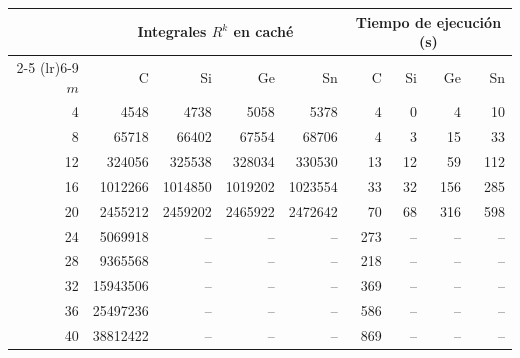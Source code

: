 \begin{tabular}{rrrrrrrrr}
    \toprule
     & \multicolumn{4}{c}{Integrales $R^k$ en caché} & \multicolumn{4}{c}{Tiempo de ejecución (s)} \\
    \cmidrule(lr){2-5} \cmidrule(lr){6-9}
    $m$ & C & Si & Ge & Sn & C & Si & Ge & Sn \\
    \midrule
    4 & 4548 & 4738 & 5058 & 5378 & 4 & 0 & 4 & 10 \\
    8 & 65718 & 66402 & 67554 & 68706 & 4 & 3 & 15 & 33 \\
    12 & 324056 & 325538 & 328034 & 330530 & 13 & 12 & 59 & 112 \\
    16 & 1012266 & 1014850 & 1019202 & 1023554 & 33 & 32 & 156 & 285 \\
    20 & 2455212 & 2459202 & 2465922 & 2472642 & 70 & 68 & 316 & 598 \\
    24 & 5069918 & -- & -- & -- & 273 & -- & -- & -- \\
    28 & 9365568 & -- & -- & -- & 218 & -- & -- & -- \\
    32 & 15943506 & -- & -- & -- & 369 & -- & -- & -- \\
    36 & 25497236 & -- & -- & -- & 586 & -- & -- & -- \\
    40 & 38812422 & -- & -- & -- & 869 & -- & -- & -- \\
    \bottomrule
\end{tabular}
